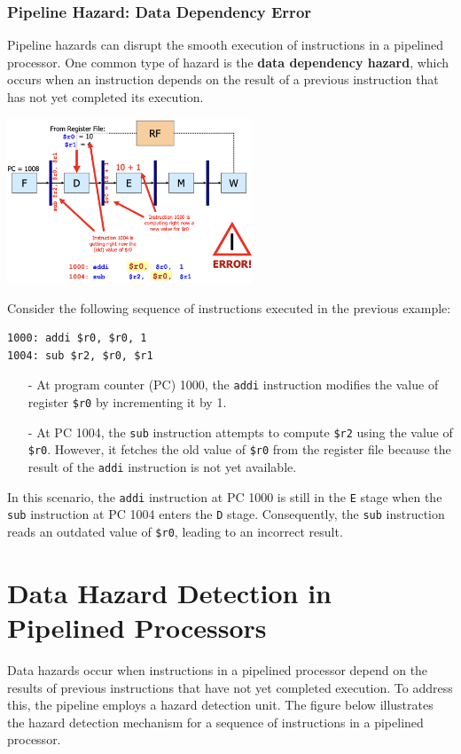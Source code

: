 \subsubsection{Pipeline Hazard: Data Dependency Error}
Pipeline hazards can disrupt the smooth execution of instructions in a pipelined processor. One common type of hazard is the \textbf{data dependency hazard}, which occurs when an instruction depends on the result of a previous instruction that has not yet completed its execution.
\begin{center}
    \includegraphics[width=0.55\textwidth]{chapters/chapter4c/images/problem.png}
\end{center}
Consider the following sequence of instructions executed in the previous example:
\begin{verbatim}
1000: addi $r0, $r0, 1
1004: sub $r2, $r0, $r1
\end{verbatim}

\begin{itemize}
    \item[-] At program counter (PC) 1000, the \texttt{addi} instruction modifies the value of register \texttt{\$r0} by incrementing it by 1.
    \item[-] At PC 1004, the \texttt{sub} instruction attempts to compute \texttt{\$r2} using the value of \texttt{\$r0}. However, it fetches the old value of \texttt{\$r0} from the register file because the result of the \texttt{addi} instruction is not yet available.
\end{itemize}

In this scenario, the \texttt{addi} instruction at PC 1000 is still in the \texttt{E} stage when the \texttt{sub} instruction at PC 1004 enters the \texttt{D} stage. Consequently, the \texttt{sub} instruction reads an outdated value of \texttt{\$r0}, leading to an incorrect result.

\section{Data Hazard Detection in Pipelined Processors}
Data hazards occur when instructions in a pipelined processor depend on the results of previous instructions that have not yet completed execution. To address this, the pipeline employs a hazard detection unit. The figure below illustrates the hazard detection mechanism for a sequence of instructions in a pipelined processor.

